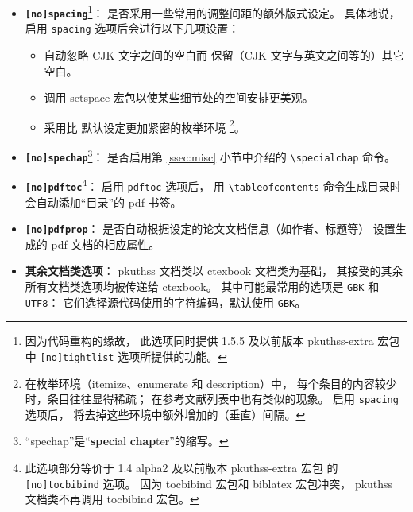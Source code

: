 \begin{itemize}
	\item \textbf{\texttt{[no]spacing}}\footnote{%
			因为代码重构的缘故，
			此选项同时提供 1.5.5 及以前版本 pkuthss-extra 宏包
			中 \texttt{[no]tightlist} 选项所提供的功能。%
		}：
		是否采用一些常用的调整间距的额外版式设定。
		具体地说，启用 \verb|spacing| 选项后会进行以下几项设置：
	\begin{itemize}
		\item 自动忽略 CJK 文字之间的空白而
			保留（CJK 文字与英文之间等的）其它空白。
		\item 调用 setspace 宏包以使某些细节处的空间安排更美观。
		\item 采用比  默认设定更加紧密的枚举环境%
			\footnote{%
				在枚举环境（itemize、enumerate 和 description）中，
				每个条目的内容较少时，条目往往显得稀疏；
				在参考文献列表中也有类似的现象。
				启用 \texttt{spacing} 选项后，
				将去掉这些环境中额外增加的（垂直）间隔。%
			}。
	\end{itemize}

	\item \textbf{\texttt{[no]spechap}}\footnote{%
			“spechap”是“\textbf{spec}ial \textbf{chap}ter”的缩写。%
		}：
		是否启用第 \ref{ssec:misc} 小节中介绍的 \verb|\specialchap| 命令。

	\item \textbf{\texttt{[no]pdftoc}}\footnote{%
			此选项部分等价于 1.4 alpha2 及以前版本 pkuthss-extra 宏包
			的 \texttt{[no]tocbibind} 选项。
			因为 tocbibind 宏包和 biblatex 宏包冲突，%
			pkuthss 文档类不再调用 tocbibind 宏包。%
		}：
		启用 \verb|pdftoc| 选项后，
		用 \verb|\tableofcontents| 命令生成目录时会自动添加“目录”的 pdf 书签。

	\item \textbf{\texttt{[no]pdfprop}}：
		是否自动根据设定的论文文档信息（如作者、标题等）
		设置生成的 pdf 文档的相应属性。

	\item \textbf{其余文档类选项}：%
		pkuthss 文档类以 ctexbook 文档类为基础，
		其接受的其余所有文档类选项均被传递给 ctexbook。
		其中可能最常用的选项是 \verb|GBK| 和 \verb|UTF8|：
		它们选择源代码使用的字符编码，默认使用 \verb|GBK|。
\end{itemize}

